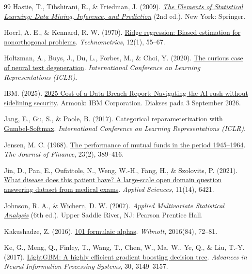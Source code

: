 \begin{thebibliography}{99}
Hastie, T., Tibshirani, R., \& Friedman, J. (2009).
\href{https://archive.org/details/elementsofstatis0000hast}{\emph{The
Elements of Statistical Learning: Data Mining, Inference, and Prediction}}
(2nd ed.). New York: Springer.

Hoerl, A. E., \& Kennard, R. W. (1970).
\href{https://doi.org/10.1080/00401706.1970.10488634}{Ridge regression: Biased
estimation for nonorthogonal problems}. \emph{Technometrics}, 12(1), 55--67.

Holtzman, A., Buys, J., Du, L., Forbes, M., \& Choi, Y. (2020).
\href{https://arxiv.org/abs/1904.09751}{The curious case of neural text
degeneration}. \emph{International Conference on Learning Representations
(ICLR)}.

IBM. (2025).
\href{https://www.ibm.com/think/x-force/2025-cost-of-a-data-breach-navigating-ai}{2025
Cost of a Data Breach Report: Navigating the AI rush without sidelining
security}. Armonk: IBM Corporation. Diakses pada 3 September 2026.

Jang, E., Gu, S., \& Poole, B. (2017).
\href{https://arxiv.org/abs/1611.01144}{Categorical reparameterization with
Gumbel-Softmax}. \emph{International Conference on Learning Representations
(ICLR)}.

Jensen, M. C. (1968).
\href{https://doi.org/10.1111/j.1540-6261.1968.tb00815.x}{The performance of
mutual funds in the period 1945--1964}. \emph{The Journal of Finance}, 23(2),
389--416.

Jin, D., Pan, E., Oufattole, N., Weng, W.-H., Fang, H., \& Szolovits, P.
(2021). \href{https://arxiv.org/abs/2009.13081}{What disease does this patient
have? A large-scale open domain question answering dataset from medical
exams}. \emph{Applied Sciences}, 11(14), 6421.

Johnson, R. A., \& Wichern, D. W. (2007).
\href{https://archive.org/details/appliedmultivari0000john}{\emph{Applied
Multivariate Statistical Analysis}} (6th ed.). Upper Saddle River, NJ: Pearson
Prentice Hall.

Kakushadze, Z. (2016).
\href{https://arxiv.org/abs/1601.00991}{101 formulaic alphas}.
\emph{Wilmott}, 2016(84), 72--81.

Ke, G., Meng, Q., Finley, T., Wang, T., Chen, W., Ma, W., Ye, Q., \& Liu, T.-Y.
(2017).
\href{https://papers.nips.cc/paper/6907-lightgbm-a-highly-efficient-gradient-boosting-decision-tree}{LightGBM:
A highly efficient gradient boosting decision tree}. \emph{Advances in Neural
Information Processing Systems}, 30, 3149--3157.


\end{thebibliography}

